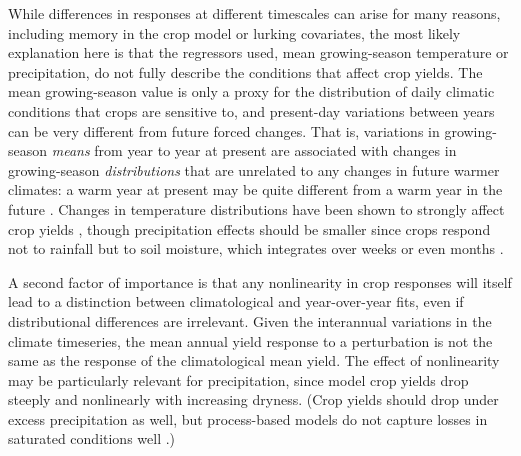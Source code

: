 \documentclass[gmd, manuscript]{copernicus} %
\begin{document}
\begin{figure}[ht]
{       %
       }
   \label{fig:yearvclim}
\end{figure}


While differences in responses at different timescales %
can arise for many reasons, including memory in the crop model or lurking covariates, the most likely explanation here is that the regressors used, mean growing-season temperature or precipitation, do not fully describe the conditions that affect crop yields. 
The mean growing-season value is only a proxy for the distribution of daily climatic conditions that crops are sensitive to, and present-day variations between years can be very different from future forced changes. 
That is, variations in growing-season \textit{means} from year to year at present are associated with changes in growing-season \textit{distributions} that are unrelated to any changes in future warmer climates: a warm year at present may be quite different from a warm year in the future \citep[e.g.][]{Ruane2016}. %
Changes in temperature distributions have been shown to strongly affect crop yields \citep[e.g.][]{Hansen2000, Gadgil2002}, though precipitation effects should be smaller since crops respond not to rainfall but to soil moisture, which integrates over weeks or even months \citep[e.g.][]{potter2005effects, Glotter14, CHALLINOR200499}. 

A second factor of importance is that any nonlinearity in crop responses will itself lead to a distinction between climatological and year-over-year fits, even if distributional differences are irrelevant. 
Given the interannual variations in the climate timeseries, the mean annual yield response to a perturbation is not the same as the response of the climatological mean yield. 
The effect of nonlinearity may be particularly relevant for precipitation, since model crop yields drop steeply and nonlinearly with increasing dryness. 
(Crop yields should drop under excess precipitation as well, but process-based models do not capture losses in saturated conditions well \citep[e.g.][]{Glotter15,Li2019}.) 
\end{document}
